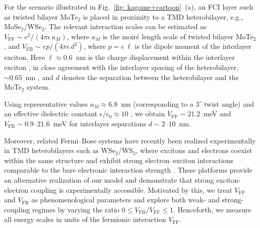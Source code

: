 \documentclass[aps,prl,twocolumn,amsmath,amssymb,nofootinbib,superscriptaddress,floatfix]{revtex4-1}
\begin{document}
{
For the scenario illustrated in Fig.~\ref{fig: kagome+cartoon}~(a), an FCI layer such as twisted bilayer MoTe$_2$ is placed in proximity to a TMD heterobilayer, e.g., MoSe$_2$/WSe$_2$. The relevant interaction scales can be estimated as
$V_{\text{FF}} \sim e^2/(4\pi\epsilon\,a_M)$, where $a_M$ is the moir\'e length scale of twisted bilayer MoTe$_2$, and
$V_{\text{FB}} \sim e p/(4\pi\epsilon\,d^2)$, where $p = e\,\ell$ is the dipole moment of the interlayer exciton.
Here $\ell \approx 0.6$~nm is the charge displacement within the interlayer exciton \cite{jauregui2019electrical,shanks2021nanoscale}, in close agreement with the interlayer spacing of the heterobilayer, $\sim 0.65$~nm \cite{karni2019infrared}, and $d$ denotes the separation between the heterobilayer and the MoTe$_2$ system.

Using representative values $a_M \approx 6.8$~nm (corresponding to a $3^\circ$ twist angle) and an effective dielectric constant $\epsilon/\epsilon_0 \approx 10$ \cite{laturia2018dielectric,kutrowska2022exploring}, we obtain
$V_{\text{FF}} \sim 21.2$~meV and
$V_{\text{FB}} \sim 0.9$--$21.6$~meV for interlayer separations $d \sim 2$--$10$~nm.

Moreover, related Fermi--Bose systems have recently been realized experimentally in TMD heterobilayers such as WSe$_2$/WS$_2$, where excitons and electrons coexist within the same structure and exhibit strong electron--exciton interactions comparable to the bare electronic interaction strength \cite{xiong2023correlated,park2023dipole,gao2024excitonic,lian2024valley,wang2023intercell}. These platforms provide an alternative realization of our model and demonstrate that
strong exciton-electron coupling
is experimentally accessible. Motivated by this, we treat $V_{\text{FF}}$ and $V_{\text{FB}}$ as phenomenological parameters and explore both weak- and strong-coupling regimes by varying the ratio $0 \leq V_{\text{FB}}/V_{\text{FF}} \leq 1$.
Henceforth, we measure all energy scales in units of the fermionic interaction $V_{\text{FF}}$.
}
\end{document}
